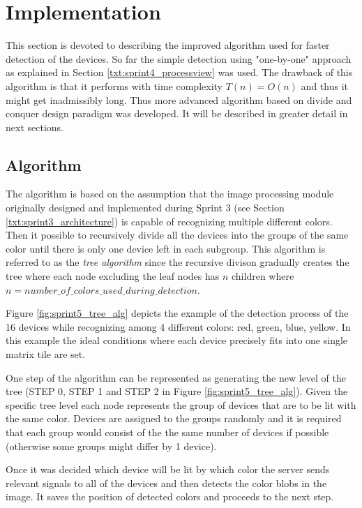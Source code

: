 \section{Implementation} \label{txt:sprint5_immplementation}
This section is devoted to describing the improved algorithm used for faster detection of the devices. So far the simple detection using "one-by-one" approach as explained in Section \ref{txt:sprint4_processview} was used. The drawback of this algorithm is that it performs with time complexity $T(n) = O(n)$ and thus it might get inadmissibly long. Thus more advanced algorithm based on divide and conquer design paradigm was developed. It will be described in greater detail in next sections.

\subsection{Algorithm}
The algorithm is based on the assumption that the image processing module originally designed and implemented during Sprint 3 (see Section \ref{txt:sprint3_architecture}) is capable of recognizing multiple different colors. Then it possible to recursively divide all the devices into the groups of the same color until there is only one device left in each subgroup. This algorithm is referred to as the \textit{tree algorithm} since the recursive divison gradually creates the tree where each node excluding the leaf nodes has $n$ children where $n = number\_of\_colors\_used\_during\_detection$.

Figure \ref{fig:sprint5_tree_alg} depicts the example of the detection process of the 16 devices while recognizing among 4 different colors: red, green, blue, yellow. In this example the ideal conditions where each device precisely fits into one single matrix tile are set. 

One step of the algorithm can be represented as generating the new level of the tree (STEP 0, STEP 1 and STEP 2 in Figure \ref{fig:sprint5_tree_alg}). Given the specific tree level each node represents the group of devices that are to be lit with the same color. Devices are assigned to the groups randomly and it is required that each group would consist of the the same number of devices if possible (otherwise some groups might differ by 1 device).

Once it was decided which device will be lit by which color the server sends relevant signals to all of the devices and then detects the color blobs in the image. It saves the position of detected colors and proceeds to the next step.

